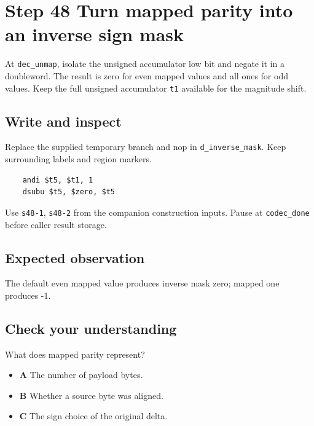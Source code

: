 \section{Step 48 Turn mapped parity into an inverse sign mask}\label{delta-s48}

At \texttt{dec\_unmap}, isolate the unsigned accumulator low bit and negate it in a doubleword. The result is zero for even mapped values and all ones for odd values. Keep the full unsigned accumulator \texttt{t1} available for the magnitude shift.

\subsection{Write and inspect}
Replace the supplied temporary branch and nop in \texttt{d\_inverse\_mask}. Keep surrounding labels and region markers.

\begin{verbatim}
    andi $t5, $t1, 1
    dsubu $t5, $zero, $t5
\end{verbatim}
Use \texttt{s48-1}, \texttt{s48-2} from the companion construction inputs. Pause at \texttt{codec\_done} before caller result storage.

\subsection{Expected observation}
The default even mapped value produces inverse mask zero; mapped one produces -1.

\subsection{Check your understanding}
What does mapped parity represent?

\begin{itemize}
\item \textbf{A} The number of payload bytes.
\item \textbf{B} Whether a source byte was aligned.
\item \textbf{C} The sign choice of the original delta.
\end{itemize}
